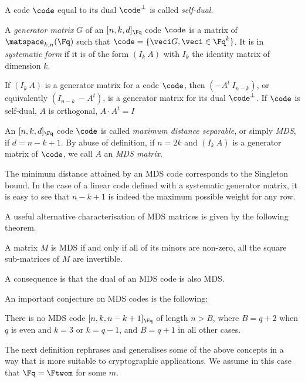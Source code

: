 A code $\code$ equal to its dual $\code^\bot$ is called \emph{self-dual}.


\begin{defi}
A \emph{generator matrix} $G$ of an $[n, k, d]_{\Fq}$ code $\code$ is a matrix of $\matspace_{k,n}(\Fq)$ such that
$\code = \{\veci G, \veci \in \Fq^k\}$. It is in \emph{systematic form} if it is of the form $(I_k~A)$ with
$I_k$ the identity matrix of dimension $k$.
\end{defi}

If $(I_k~A)$ is a generator matrix for a code $\code$, then $(-A^t~I_{n-k})$, or equivalently $(I_{n-k}~-A^t)$,
is a generator matrix for its dual $\code^\bot$. If $\code$ is self-dual, $A$ is orthogonal,
\ie $A\cdot A^t = I$

\begin{defi}
An $[n,k,d]_{\Fq}$ code $\code$ is called \emph{maximum distance separable}, or simply \emph{MDS}, if $d = n - k + 1$.
By abuse of definition, if $n = 2k$ and $(I_k~A)$ is a generator matrix of $\code$, we call $A$ an \emph{MDS matrix}.
\end{defi}

The minimum distance attained by an MDS code corresponds to the Singleton bound. In the case of a linear code 
defined with a
systematic generator matrix, it is easy to see that $n - k + 1$ is indeed the maximum possible weight for any row.

A useful alternative characterisation of MDS matrices is given by the following theorem.

\begin{thm} 
\label{thm:mds_minors}
A matrix $M$ is MDS if and only if all of its minors are non-zero, \ie all the square sub-matrices of $M$ are invertible.
\end{thm}

A consequence is that the dual of an MDS code is also MDS.

An important conjecture on MDS codes is the following:

\begin{conj}
There is no MDS code $[n,k,n-k+1]_{\Fq}$ of length $n > B$,
where $B = q + 2$ when $q$ is even and $k = 3$ or $k = q - 1$,
and $B = q + 1$ in all other cases. 
\end{conj}

The next definition rephrases and generalises some of the above concepts in a way that is more suitable to cryptographic applications.
We assume in this case that $\Fq = \Ftwom$ for some $m$.

